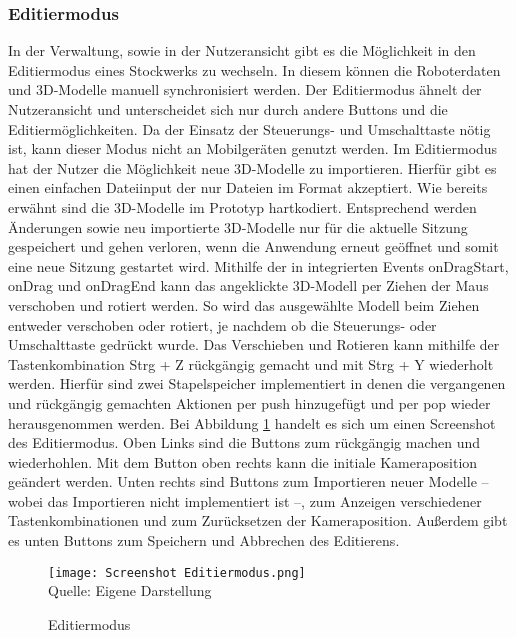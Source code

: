 \subsubsection{Editiermodus}\label{sec:EditMode}
In der Verwaltung, sowie in der Nutzeransicht gibt es die Möglichkeit in den Editiermodus eines Stockwerks zu wechseln. In diesem können die Roboterdaten und 3D-Modelle manuell synchronisiert werden. Der Editiermodus ähnelt der Nutzeransicht und unterscheidet sich nur durch andere Buttons und die Editiermöglichkeiten. Da der Einsatz der Steuerungs- und Umschalttaste nötig ist, kann dieser Modus nicht an Mobilgeräten genutzt werden. Im Editiermodus hat der Nutzer die Möglichkeit neue 3D-Modelle zu importieren. Hierfür gibt es einen einfachen Dateiinput der nur Dateien im \glb{} Format akzeptiert. Wie bereits erwähnt sind die 3D-Modelle im Prototyp hartkodiert. Entsprechend werden Änderungen sowie neu importierte 3D-Modelle nur für die aktuelle Sitzung gespeichert und gehen verloren, wenn die Anwendung erneut geöffnet und somit eine neue Sitzung gestartet wird. Mithilfe der in \deckgl{} integrierten Events onDragStart, onDrag und onDragEnd \cite{DeckglInteractivity} kann das angeklickte 3D-Modell per Ziehen der Maus verschoben und rotiert werden. So wird das ausgewählte Modell beim Ziehen entweder verschoben oder rotiert, je nachdem ob die Steuerungs- oder Umschalttaste gedrückt wurde. Das Verschieben und Rotieren kann mithilfe der Tastenkombination Strg + Z rückgängig gemacht und mit Strg + Y wiederholt werden. Hierfür sind zwei Stapelspeicher implementiert in denen die vergangenen und rückgängig gemachten Aktionen per push hinzugefügt und per pop wieder herausgenommen werden. Bei Abbildung \ref{fig:EditmodeScreenshot} handelt es sich um einen Screenshot des Editiermodus. Oben Links sind die Buttons zum rückgängig machen und wiederhohlen. Mit dem Button oben rechts kann die initiale Kameraposition geändert werden. Unten rechts sind Buttons zum Importieren neuer Modelle – wobei das Importieren nicht implementiert ist –, zum Anzeigen verschiedener Tastenkombinationen und zum Zurücksetzen der Kameraposition. Außerdem gibt es unten Buttons zum Speichern und Abbrechen des Editierens.

\begin{figure}[H]
    \caption{Editiermodus}\label{fig:EditmodeScreenshot}
    \texttt{[image: Screenshot Editiermodus.png]}
    \\
    Quelle: Eigene Darstellung
\end{figure}

